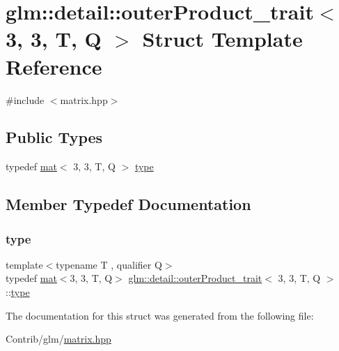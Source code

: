 \hypertarget{structglm_1_1detail_1_1outer_product__trait_3_013_00_013_00_01_t_00_01_q_01_4}{}\section{glm\+:\+:detail\+:\+:outer\+Product\+\_\+trait$<$ 3, 3, T, Q $>$ Struct Template Reference}
\label{structglm_1_1detail_1_1outer_product__trait_3_013_00_013_00_01_t_00_01_q_01_4}


{\ttfamily \#include $<$matrix.\+hpp$>$}

\subsection*{Public Types}
\begin{DoxyCompactItemize}
\item 
typedef \mbox{\hyperlink{structglm_1_1mat}{mat}}$<$ 3, 3, T, Q $>$ \mbox{\hyperlink{structglm_1_1detail_1_1outer_product__trait_3_013_00_013_00_01_t_00_01_q_01_4_a40c77da697de58aa2f84dab85c4d9ee8}{type}}
\end{DoxyCompactItemize}


\subsection{Member Typedef Documentation}
\mbox{\label{structglm_1_1detail_1_1outer_product__trait_3_013_00_013_00_01_t_00_01_q_01_4_a40c77da697de58aa2f84dab85c4d9ee8}} 
\subsubsection{\texorpdfstring{type}{type}}
{\footnotesize\ttfamily template$<$typename T , qualifier Q$>$ \\
typedef \mbox{\hyperlink{structglm_1_1mat}{mat}}$<$3, 3, T, Q$>$ \mbox{\hyperlink{structglm_1_1detail_1_1outer_product__trait}{glm\+::detail\+::outer\+Product\+\_\+trait}}$<$ 3, 3, T, Q $>$\+::\mbox{\hyperlink{structglm_1_1detail_1_1outer_product__trait_3_013_00_013_00_01_t_00_01_q_01_4_a40c77da697de58aa2f84dab85c4d9ee8}{type}}}



The documentation for this struct was generated from the following file\+:\begin{DoxyCompactItemize}
\item 
Contrib/glm/\mbox{\hyperlink{matrix_8hpp}{matrix.\+hpp}}\end{DoxyCompactItemize}
